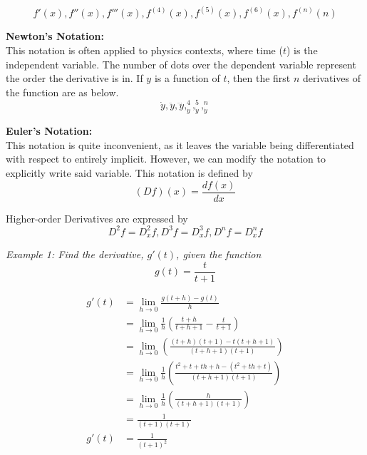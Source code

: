         \begin{equation*}
            f'(x), f''(x), f'''(x), f^{(4)}(x),f^{(5)}(x),f^{(6)}(x),f^{(n)}(n)
        \end{equation*}

        \noindent \color{purple} \textbf{Newton's Notation:} \color{black} \\

        This notation is often applied to physics contexts, where time ($t$) is the independent
        variable. The number of dots over the dependent variable represent the order the
        derivative is in. If $y$ is a function of $t$, then the first $n$ derivatives of
        the function are as below. \\

        \begin{equation*}
            \dot{y}, \ddot{y}, \dddot{y}, _{\dot{y}}^4, _{\dot{y}}^5, _{\dot{y}}^n
        \end{equation*}

        \noindent \color{purple} \textbf{Euler's Notation:} \color{black} \\
        This notation is quite inconvenient, as it leaves the variable being differentiated with
        respect to entirely implicit. However, we can modify the notation to explicitly write
        said variable. This notation is defined by \\

        \begin{equation*}
            (Df)(x) = \frac{df(x)}{dx}
        \end{equation*}

        \pagebreak
        \noindent Higher-order Derivatives are expressed by \\

        \begin{equation*}
            D^2f=D^2_xf, D^3f=D^3_xf, D^nf=D^n_xf
        \end{equation*}

        \noindent \color{blue} \textit{Example 1: Find the derivative, $g'(t)$, given the function} \\

        \begin{equation}
            g(t) = \frac{t}{t+1}
        \end{equation} \color{black}

        \begin{align*}
            g'(t) &= \lim_{h\to 0} \frac{g(t+h)-g(t)}{h} \\
            &= \lim_{h\to 0} \frac{1}{h}\left(\frac{t+h}{t+h+1}-\frac{t}{t+1}\right) \\
            &= \lim_{h\to 0}\left(\frac{(t+h)(t+1)-t(t+h+1)}{(t+h+1)(t+1)}\right) \\
            &= \lim_{h\to 0} \frac{1}{h}\left(\frac{t^2+t+th+h-(t^2+th+t)}{(t+h+1)(t+1)}\right) \\
            &= \lim_{h\to 0} \frac{1}{h} \left(\frac{h}{(t+h+1)(t+1)}\right) \\
            &= \frac{1}{(t+1)(t+1)} \\
            g'(t) &= \frac{1}{(t+1)^2}
        \end{align*}

